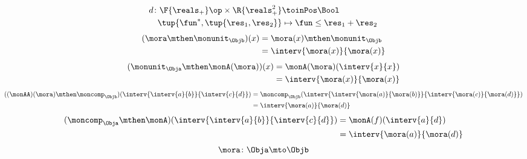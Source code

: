 {\begin{forslides}
\begin{equation}
\begin{aligned}
                d\colon \F{\reals_+}\op \times \R{\reals_+^2} & \toinPos \Bool \\
                \tup{\fun^*, \tup{\res_1,\res_2}}             & \mapsto \fun \leq \res_1+\res_2
            \end{aligned}
        \end{equation}
        \begin{equation}
            \label{eq:arrow_1}
            \begin{aligned}
                (\mora \mthen \monunit_\Objb)(x)
                 & =\mora(x)\mthen \monunit_\Objb \\
                 & =\interv{\mora(x)}{\mora(x)}
            \end{aligned}
        \end{equation}
        \begin{equation}
            \label{eq:arrow_2}
            \begin{aligned}
                (\monunit_\Obja \mthen \monA(\mora))(x)
                 & =\monA(\mora)(\interv{x}{x}) \\
                 & =\interv{\mora(x)}{\mora(x)}
            \end{aligned}
        \end{equation}
        \begin{equation}
            \label{eq:arrow_3}
            \begin{aligned}
                ((\monAA)(\mora)\mthen \moncomp_\Objb)(\interv{\interv{a}{b}}{\interv{c}{d}}) & =\moncomp_\Objb(\interv{\interv{\mora(a)}{\mora(b)}}{\interv{\mora(c)}{\mora(d)}}) \\
                                                                                              & =\interv{\mora(a)}{\mora(d)}
            \end{aligned}
        \end{equation}
        \begin{equation}
            \label{eq:arrow_4}
            \begin{aligned}
                (\moncomp_\Obja\mthen \monA)(\interv{\interv{a}{b}}{\interv{c}{d}})
                 & =\monA(f)(\interv{a}{d}) \\
                 & =\interv{\mora(a)}{\mora(d)}
            \end{aligned}
        \end{equation}
        \begin{equation}
            \label{eq:arrow_5}
            \mora\colon \Obja \mto \Objb
        \end{equation}
    \end{forslides}
}
